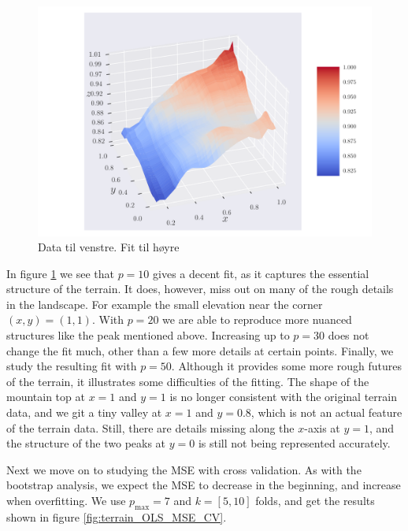 \documentclass[reprint,english,notitlepage,aps,nobalancelastpage,nofootinbib]{revtex4-1}  %
\begin{document}
\begin{figure}[h]
	\endminipage\hfill
	\includegraphics[width=\linewidth]{SRTM_prediction_p50.pdf}
	\endminipage
	\caption{Data til venstre. Fit til høyre}
  \label{fig:terrain_fit}
\end{figure}

In figure \ref{fig:terrain_fit} we see that $p=10$ gives a decent fit, as it captures the essential structure of the terrain. It does, however, miss out on many of the rough details in the landscape. For example the small elevation near the corner $(x,y) = (1,1)$. With $p=20$ we are able to reproduce more nuanced structures like the peak mentioned above. Increasing up to $p=30$ does not change the fit much, other than a few more details at certain points. Finally, we study the resulting fit with $p=50$. Although it provides some more rough futures of the terrain, it illustrates some difficulties of the fitting. The shape of the mountain top at $x=1$ and $y=1$ is no longer consistent with the original terrain data, and we git a tiny valley at $x=1$ and $y=0.8$, which is not an actual feature of the terrain data. Still, there are details missing along the $x$-axis at $y=1$, and the structure of the two peaks at $y=0$ is still not being represented accurately.

Next we move on to studying the MSE with cross validation. As with the bootstrap analysis, we expect the MSE to decrease in the beginning, and increase when overfitting. We use $p_\text{max} = 7$ and $k=[5,10]$ folds, and get the results shown in figure \ref{fig:terrain_OLS_MSE_CV}.
\end{document}
